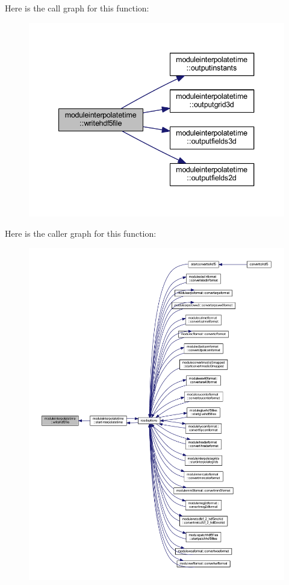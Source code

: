 Here is the call graph for this function\+:\nopagebreak
\begin{figure}[H]
\begin{center}
\leavevmode
\includegraphics[width=340pt]{namespacemoduleinterpolatetime_aa6ef370ca77afaafd53df4bf43525f3d_cgraph}
\end{center}
\end{figure}
Here is the caller graph for this function\+:\nopagebreak
\begin{figure}[H]
\begin{center}
\leavevmode
\includegraphics[width=350pt]{namespacemoduleinterpolatetime_aa6ef370ca77afaafd53df4bf43525f3d_icgraph}
\end{center}
\end{figure}


